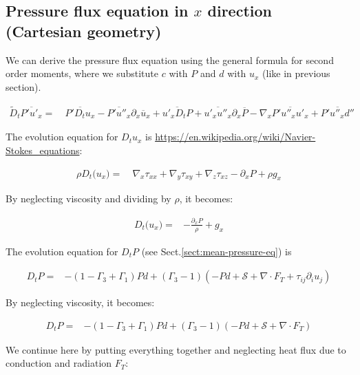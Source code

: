 \documentclass[10pt,paper=a4]{report}
\newcommand{\eht}{\overline}
\newcommand{\fht}{\widetilde}
\begin{document}
\subsection{Pressure flux equation in $x$ direction (Cartesian geometry)}

We can derive the pressure flux equation using the general formula for second order moments, where we substitute $c$ with $P$ and $d$ with $u_x$ (like in previous section).

\begin{align}
  \fht{D}_t \eht{P'u'_x} = & \ \eht{P'D_t u_x} - \eht{P'u''_x} \partial_x \eht{u}_x + \eht{u'_x D_t P} + \eht{u'_x u''_x} \partial_x \eht{P} - \nabla_x \eht{P' u''_x u'_x} + \eht{P'u''_x d''} 
\end{align}

\noindent
The evolution equation for $D_t u_x$ is \href{https://en.wikipedia.org/wiki/Navier-Stokes_equations}{https://en.wikipedia.org/wiki/Navier-Stokes\_equations}: 

\begin{align}
\rho D_{t} \big(u_{x}\big) = & \ \nabla_x \tau_{xx} + \nabla_y \tau_{xy} + \nabla_z \tau_{xz} - \partial_{x} P + \rho g_x 
\end{align}

\noindent
By neglecting viscosity and dividing by $\rho$, it becomes:

\begin{align}
D_{t} \big(u_{x}\big) = & -\frac{\partial_{x} P}{\rho}  + g_x 
\end{align}

\noindent
The evolution equation for $D_t P$ (see Sect.\ref{sect:mean-pressure-eq}) is 

\begin{align}
D_t P = & -(1-\Gamma_3+\Gamma_1)Pd + (\Gamma_3 -1)(-Pd + {\mathcal S} + \nabla \cdot F_T + \tau_{ij}\partial_i u_j)
\end{align}

\noindent
By neglecting viscosity, it becomes:

\begin{align}
D_t P = & -(1-\Gamma_3+\Gamma_1)Pd + (\Gamma_3 -1)(-Pd + {\mathcal S} + \nabla \cdot F_T)
\end{align}

\noindent We continue here by putting everything together and neglecting heat flux due to conduction and radiation $F_T$:
\end{document}
